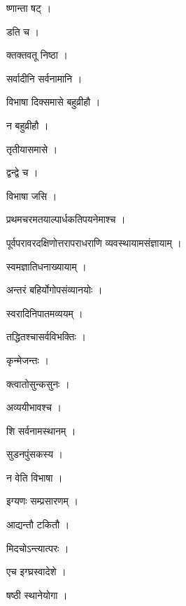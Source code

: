 \documentclass[10pt, openany]{book}
\begin{document}
\noindent ष्णान्ता षट् ।

\noindent डति च ।

\noindent क्तक्तवतू निष्ठा ।

\noindent सर्वादीनि सर्वनामानि ।

\noindent विभाषा दिक्समासे बहुव्रीहौ ।

\noindent न बहुव्रीहौ ।

\noindent तृतीयासमासे ।

\noindent द्वन्द्वे च ।

\noindent विभाषा जसि ।

\noindent प्रथमचरमतयाल्पार्धकतिपयनेमाश्च ।

\noindent पूर्वपरावरदक्षिणोत्तरापराधराणि व्यवस्थायामसंज्ञायाम् ।

\noindent स्वमज्ञातिधनाख्यायाम् ।

\noindent अन्तरं बहिर्योगोपसंव्यानयोः ।

\noindent स्वरादिनिपातमव्ययम् ।

\noindent तद्धितश्चासर्वविभक्तिः ।

\noindent कृन्मेजन्तः ।

\noindent क्त्वातोसुन्कसुनः ।

\noindent अव्ययीभावश्च ।

\noindent शि सर्वनामस्थानम् ।

\noindent सुडनपुंसकस्य ।

\noindent न वेति विभाषा ।

\noindent इग्यणः सम्प्रसारणम् ।

\noindent आद्यन्तौ टकितौ ।

\noindent मिदचोऽन्त्यात्परः ।

\noindent एच इग्घ्रस्वादेशे ।

\noindent षष्ठी स्थानेयोगा ।
\end{document}

